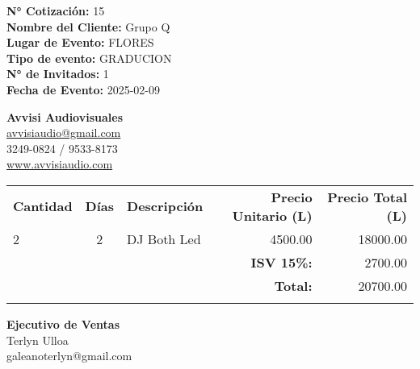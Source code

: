 \documentclass[a4paper,12pt]{article}
\begin{document}
\vspace*{1.5cm}
\noindent

\noindent
\textbf{N° Cotización:} 15 \\
\textbf{Nombre del Cliente:} Grupo Q\\
\textbf{Lugar de Evento:} FLORES \\
\textbf{Tipo de evento:} GRADUCION \\
\textbf{N° de Invitados:} 1\\
\textbf{Fecha de Evento:} 2025{-}02{-}09
\begin{flushright}
\vspace{-3.5cm}
\textbf{Avvisi Audiovisuales}\\
\href{mailto:avvisiaudio@gmail.com}{avvisiaudio@gmail.com} \\
3249-0824 / 9533-8173 \\
\href{https://avvisiaudio.com}{www.avvisiaudio.com} 
\end{flushright}
\vspace{1cm}


\noindent 
\begin{table}[h!]
    \centering
    \renewcommand{\arraystretch}{1.3} %
    \begin{tabular}{
            l
            c
            p{12cm}
            r
            r
        }
        \arrayrulecolor{primary}\hline
        \textbf{Cantidad} & \textbf{Días} & \textbf{Descripción} & \textbf{Precio Unitario (L)} & \textbf{Precio Total (L)} \\
        \arrayrulecolor{primary}\hline

        2 & 2 & DJ Both Led & 4500.00 & 18000.00 \\
     
        \arrayrulecolor{primary}\hline
        & & & \textbf{ISV 15\%:} & 2700.00 \\
        & & & \textbf{Total:} & \multicolumn{1}{r}{20700.00} \\
        \arrayrulecolor{primary}
    \end{tabular}
    \label{tab-productos-cotizados}
\end{table}

\vspace{0.4cm}
\noindent\begin{minipage}[t]{0.6\textwidth}
    \textbf{Ejecutivo de Ventas} \\
    \textbf{} Terlyn Ulloa\\
    \textbf{} galeanoterlyn@gmail.com\\
\end{minipage}%
\end{document}
